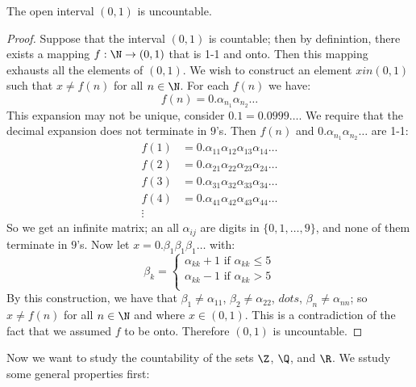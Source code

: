 \begin{theorem}
  The open interval $(0,1)$ is uncountable.
\end{theorem}
\begin{proof}
  Suppose that the interval $(0,1)$ is countable; then by definintion, there exists a mapping $f:\N \rightarrow (0,1)$ that 
  is 1-1 and onto. Then this mapping exhausts all the elements of $(0,1)$. We wish to construct an element $xin (0,1)$ such 
  that $x \neq f(n)$ for all $n \in \N$. For each $f(n)$ we have:
    \begin{equation*}
      f(n)=0.\alpha_{n_1}\alpha_{n_2}\dots
    \end{equation*}
  This expansion may not be unique, consider $0.1=0.0999\dots$. We require that the decimal expansion does not terminate in 
  $9$'s. Then $f(n)$ and $0.\alpha_{n_1}\alpha_{n_2}\dots$ are 1-1:
  \begin{align}
    f(1) &= 0.\alpha_{11}\alpha_{12}\alpha_{13}\alpha_{14}\dots \\
    f(2) &= 0.\alpha_{21}\alpha_{22}\alpha_{23}\alpha_{24}\dots \\
    f(3) &= 0.\alpha_{31}\alpha_{32}\alpha_{33}\alpha_{34}\dots \\
    f(4) &= 0.\alpha_{41}\alpha_{42}\alpha_{43}\alpha_{44}\dots \\
        \vdots
  \end{align}
So we get an infinite matrix; an all $\alpha_{ij}$ are digits in $\{0,1, \dots, 9\}$, and none of them terminate in $9$'s. 
Now let $x=0.\beta_{1}\beta_{1}\beta_{1}\dots$ with:
\begin{equation*}
  \beta_k=\begin{cases}
    \alpha_{kk}+1 \text{ if } \alpha_{kk} \leq 5 \\
    \alpha_{kk}-1 \text{ if } \alpha_{kk} > 5 \\
\end{cases}
\end{equation*}
By this construction, we have that $\beta_1 \neq \alpha_{11}$, $\beta_2 \neq \alpha_{22}$, $dots$, $\beta_n \neq \alpha_{nn}$; 
so $x \neq f(n)$ for all $n \in \N$ and where $x \in (0,1)$. This is a contradiction of the fact that we assumed $f$ to be 
onto. Therefore $(0,1)$ is uncountable.
\end{proof}

Now we want to study the countability of the sets $\Z$, $\Q$, and $\R$. We sstudy some general properties first:

